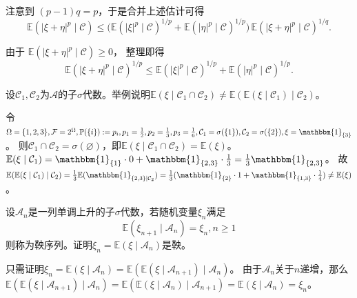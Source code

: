 \documentclass{ctexart}
\begin{document}
\begin{solution}
\begin{enumerate}
      注意到 $(p-1)q=p$，于是合并上述估计可得
      \[
        \mathbb E(|\xi+\eta|^p\mid\mathcal C)
        \le
        \bigl(
          \mathbb E(|\xi|^p\mid\mathcal C)^{1/p}
          +
          \mathbb E(|\eta|^p\mid\mathcal C)^{1/p}
        \bigr)
        \,
        \mathbb E(|\xi+\eta|^p\mid\mathcal C)^{1/q}.
      \]

      由于 $\mathbb E(|\xi+\eta|^p\mid\mathcal C)\ge 0$，
      整理即得
      \[
        \mathbb E(|\xi+\eta|^p\mid\mathcal C)^{1/p}
        \le
        \mathbb E(|\xi|^p\mid\mathcal C)^{1/p}
        +
        \mathbb E(|\eta|^p\mid\mathcal C)^{1/p}.
      \]
  \end{enumerate}
\end{solution}

\begin{problem}\label{pro:9}
  设\(\mathcal{C}_1,\mathcal{C}_2 \)为\(\mathcal{A} \)的子\(\sigma \)代数。举例说明\(\mathbb{E}(\xi \mid \mathcal{C}_1 \cap \mathcal{C}_2) \neq \mathbb{E}(\mathbb{E}(\xi \mid \mathcal{C}_1) \mid \mathcal{C}_2) \)。
\end{problem}
\begin{solution}
  令\(\Omega=\{1,2,3\},\mathcal{F}=2^\Omega,\mathbb{P}(\{i\}):=p_i,p_{1}=\frac{1}{2},p_{2}=\frac{1}{3},p_{3}=\frac{1}{6},\mathcal{C}_1=\sigma(\{1\}),\mathcal{C}_2=\sigma(\{2\}),\xi = \mathbbm{1}_{\{3\}} \)。
  则\(\mathcal{C}_1 \cap \mathcal{C}_2 = \sigma(\varnothing) \)，即\(\mathbb{E}(\xi \mid \mathcal{C}_1 \cap \mathcal{C}_{2}) = \mathbb{E}(\xi) \)。\(\mathbb{E}(\xi \mid \mathcal{C}_{1}) = \mathbbm{1}_{\{1\}} \cdot 0 + \mathbbm{1}_{\{2,3\}} \cdot \frac{1}{3} = \frac{1}{3}\mathbbm{1}_{\{2,3\}} \)。
  故\(\mathbb{E}(\mathbb{E}(\xi \mid \mathcal{C}_{1})\mid \mathcal{C}_{2}) = \frac{1}{3} \mathbb{E}(\mathbbm{1}_{\{2,3\} \mid \mathcal{C}_{2}}) = \frac{1}{3} (\mathbbm{1}_{\{2\}} \cdot 1 + \mathbbm{1}_{\{1,3\}} \cdot \frac{1}{4}) \neq \mathbb{E}(\xi) \)。
\end{solution}

\begin{problem}\label{pro:11}
  设\(\mathcal{A}_n \)是一列单调上升的子\(\sigma \)代数，若随机变量\(\xi_n \)满足
  \[
    \mathbb{E}(\xi_{n + 1} \mid \mathcal{A}_n)=\xi_n,n \geq 1
  \]则称为鞅序列。证明\(\xi_n=\mathbb{E}(\xi \mid \mathcal{A}_n) \)是鞅。
\end{problem}
\begin{solution}
  只需证明\(\xi_n=\mathbb{E}(\xi \mid \mathcal{A}_n)=\mathbb{E}(\mathbb{E}(\xi \mid \mathcal{A}_{n + 1}) \mid \mathcal{A}_n) \)。
  由于\(\mathcal{A}_n \)关于\(n \)递增，那么\(\mathbb{E}(\mathbb{E}(\xi \mid \mathcal{A}_{n + 1}) \mid \mathcal{A}_n)=\mathbb{E}(\mathbb{E}(\xi \mid \mathcal{A}_n) \mid \mathcal{A}_{n + 1})=\mathbb{E}(\xi \mid \mathcal{A}_n)=\xi_n \)。
\end{solution}
\end{document}
